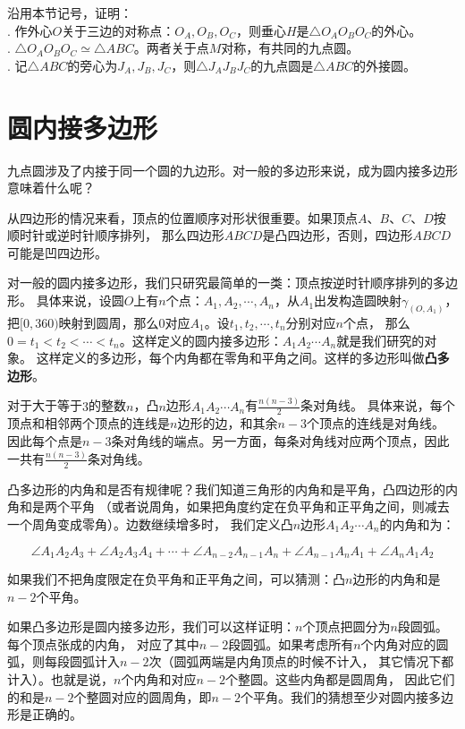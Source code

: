 \documentclass[12pt,UTF8,fontset=none]{ctexbook}
\begin{document}
\begin{xt}
    沿用本节记号，证明：\\
    . 作外心$O$关于三边的对称点：$O_A, O_B, O_C$，则垂心$H$是$\triangle O_AO_BO_C$的外心。\\
    . $\triangle O_AO_BO_C \simeq \triangle ABC$。两者关于点$M$对称，有共同的九点圆。\\
    . 记$\triangle ABC$的旁心为$J_A, J_B, J_C$，则$\triangle J_AJ_BJ_C$的九点圆是$\triangle ABC$的外接圆。
\end{xt}

\section{圆内接多边形}
九点圆涉及了内接于同一个圆的九边形。对一般的多边形来说，成为圆内接多边形意味着什么呢？

从四边形的情况来看，顶点的位置顺序对形状很重要。如果顶点$A$、$B$、$C$、$D$按顺时针或逆时针顺序排列，
那么四边形$ABCD$是凸四边形，否则，四边形$ABCD$可能是凹四边形。

对一般的圆内接多边形，我们只研究最简单的一类：顶点按逆时针顺序排列的多边形。
具体来说，设圆$O$上有$n$个点：$A_1, A_2, \cdots , A_n$，从$A_1$出发构造圆映射$\gamma_{(O,A_1)}$，
把$[0, 360)$映射到圆周，那么$0$对应$A_1$。设$t_1, t_2, \cdots , t_n$分别对应$n$个点，
那么$0 = t_1 < t_2 < \cdots < t_n$。这样定义的圆内接多边形：$A_1A_2\cdots A_n$就是我们研究的对象。
这样定义的多边形，每个内角都在零角和平角之间。这样的多边形叫做\textbf{凸多边形}。

对于大于等于$3$的整数$n$，凸$n$边形$A_1A_2\cdots A_n$有$\frac{n(n-3)}{2}$条对角线。
具体来说，每个顶点和相邻两个顶点的连线是$n$边形的边，和其余$n-3$个顶点的连线是对角线。
因此每个点是$n-3$条对角线的端点。另一方面，每条对角线对应两个顶点，因此一共有$\frac{n(n-3)}{2}$条对角线。

凸多边形的内角和是否有规律呢？我们知道三角形的内角和是平角，凸四边形的内角和是两个平角
（或者说周角，如果把角度约定在负平角和正平角之间，则减去一个周角变成零角）。边数继续增多时，
我们定义凸$n$边形$A_1A_2\cdots A_n$的内角和为：

$$ \angle A_1A_2A_3 + \angle A_2A_3A_4 + \cdots + \angle A_{n-2}A_{n-1}A_{n} + \angle A_{n-1}A_{n}A_{1}+ \angle A_{n}A_{1}A_{2}$$

如果我们不把角度限定在负平角和正平角之间，可以猜测：凸$n$边形的内角和是$n-2$个平角。

如果凸多边形是圆内接多边形，我们可以这样证明：$n$个顶点把圆分为$n$段圆弧。每个顶点张成的内角，
对应了其中$n-2$段圆弧。如果考虑所有$n$个内角对应的圆弧，则每段圆弧计入$n-2$次（圆弧两端是内角顶点的时候不计入，
其它情况下都计入）。也就是说，$n$个内角和对应$n-2$个整圆。这些内角都是圆周角，
因此它们的和是$n-2$个整圆对应的圆周角，即$n-2$个平角。我们的猜想至少对圆内接多边形是正确的。
\end{document}
